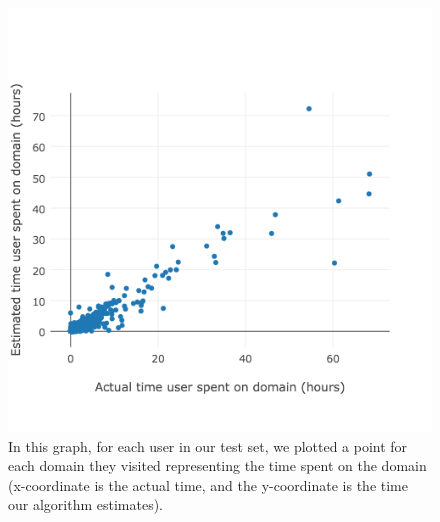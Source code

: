 \documentclass{sigchi}
\begin{document}
\begin{figure}
    \centering
    \includegraphics[width=0.9\columnwidth]{domain-timespent-plot}
    \caption{In this graph, for each user in our test set, we plotted a point for each domain they visited representing the time spent on the domain (x-coordinate is the actual time, and the y-coordinate is the time our algorithm estimates).}
    \label{fig:domain-timespent-plot}
\end{figure}









\end{document}
